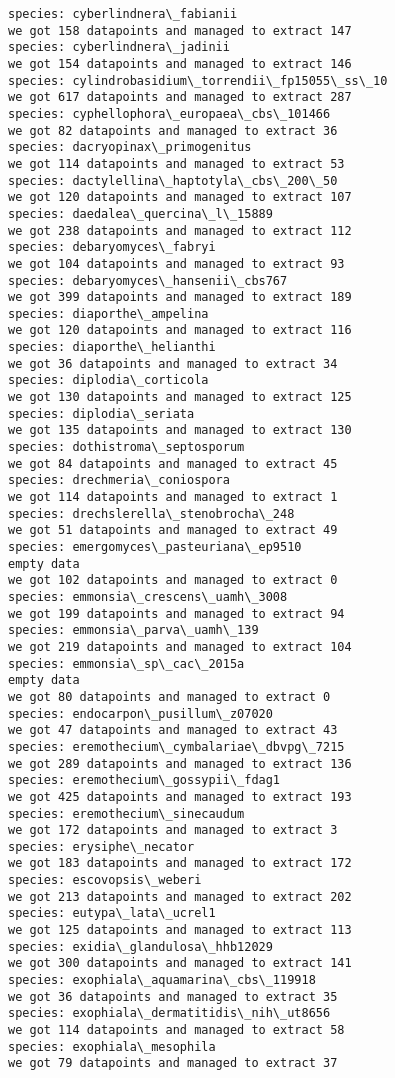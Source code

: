 \documentclass[11pt]{article}
\begin{document}
\begin{Verbatim}[commandchars=\\\{\}]
species: cyberlindnera\_fabianii
we got 158 datapoints and managed to extract 147
species: cyberlindnera\_jadinii
we got 154 datapoints and managed to extract 146
species: cylindrobasidium\_torrendii\_fp15055\_ss\_10
we got 617 datapoints and managed to extract 287
species: cyphellophora\_europaea\_cbs\_101466
we got 82 datapoints and managed to extract 36
species: dacryopinax\_primogenitus
we got 114 datapoints and managed to extract 53
species: dactylellina\_haptotyla\_cbs\_200\_50
we got 120 datapoints and managed to extract 107
species: daedalea\_quercina\_l\_15889
we got 238 datapoints and managed to extract 112
species: debaryomyces\_fabryi
we got 104 datapoints and managed to extract 93
species: debaryomyces\_hansenii\_cbs767
we got 399 datapoints and managed to extract 189
species: diaporthe\_ampelina
we got 120 datapoints and managed to extract 116
species: diaporthe\_helianthi
we got 36 datapoints and managed to extract 34
species: diplodia\_corticola
we got 130 datapoints and managed to extract 125
species: diplodia\_seriata
we got 135 datapoints and managed to extract 130
species: dothistroma\_septosporum
we got 84 datapoints and managed to extract 45
species: drechmeria\_coniospora
we got 114 datapoints and managed to extract 1
species: drechslerella\_stenobrocha\_248
we got 51 datapoints and managed to extract 49
species: emergomyces\_pasteuriana\_ep9510
empty data
we got 102 datapoints and managed to extract 0
species: emmonsia\_crescens\_uamh\_3008
we got 199 datapoints and managed to extract 94
species: emmonsia\_parva\_uamh\_139
we got 219 datapoints and managed to extract 104
species: emmonsia\_sp\_cac\_2015a
empty data
we got 80 datapoints and managed to extract 0
species: endocarpon\_pusillum\_z07020
we got 47 datapoints and managed to extract 43
species: eremothecium\_cymbalariae\_dbvpg\_7215
we got 289 datapoints and managed to extract 136
species: eremothecium\_gossypii\_fdag1
we got 425 datapoints and managed to extract 193
species: eremothecium\_sinecaudum
we got 172 datapoints and managed to extract 3
species: erysiphe\_necator
we got 183 datapoints and managed to extract 172
species: escovopsis\_weberi
we got 213 datapoints and managed to extract 202
species: eutypa\_lata\_ucrel1
we got 125 datapoints and managed to extract 113
species: exidia\_glandulosa\_hhb12029
we got 300 datapoints and managed to extract 141
species: exophiala\_aquamarina\_cbs\_119918
we got 36 datapoints and managed to extract 35
species: exophiala\_dermatitidis\_nih\_ut8656
we got 114 datapoints and managed to extract 58
species: exophiala\_mesophila
we got 79 datapoints and managed to extract 37

\end{Verbatim}
\end{document}
